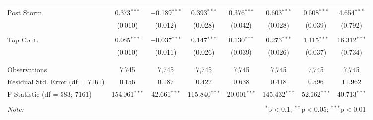 \begin{table}[!htbp]
\begin{tabular}{@{\extracolsep{5pt}}lccccccc}
  & & & & & & & \\ 
 Post Storm & 0.373$^{***}$ & $-$0.189$^{***}$ & 0.393$^{***}$ & 0.376$^{***}$ & 0.603$^{***}$ & 0.508$^{***}$ & 4.654$^{***}$ \\ 
  & (0.010) & (0.012) & (0.028) & (0.042) & (0.028) & (0.039) & (0.792) \\ 
  & & & & & & & \\ 
 Top Cont. & 0.085$^{***}$ & $-$0.037$^{***}$ & 0.147$^{***}$ & 0.130$^{***}$ & 0.273$^{***}$ & 1.115$^{***}$ & 16.312$^{***}$ \\ 
  & (0.010) & (0.011) & (0.026) & (0.039) & (0.026) & (0.037) & (0.734) \\ 
  & & & & & & & \\ 
\hline \\[-1.8ex] 
Observations & 7,745 & 7,745 & 7,745 & 7,745 & 7,745 & 7,745 & 7,745 \\ 
Residual Std. Error (df = 7161) & 0.156 & 0.187 & 0.422 & 0.638 & 0.418 & 0.596 & 11.962 \\ 
F Statistic (df = 583; 7161) & 154.061$^{***}$ & 42.661$^{***}$ & 115.840$^{***}$ & 20.001$^{***}$ & 145.432$^{***}$ & 52.662$^{***}$ & 40.713$^{***}$ \\ 
\hline 
\hline \\[-1.8ex] 
\textit{Note:}  & \multicolumn{7}{r}{$^{*}$p$<$0.1; $^{**}$p$<$0.05; $^{***}$p$<$0.01} \\ 
\end{tabular} 
\end{table} 
